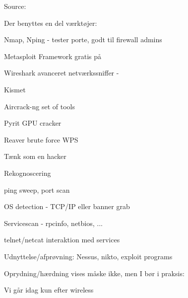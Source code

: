 \documentclass[20pt,landscape,a4paper,footrule]{foils}
\begin{document}


Source: 



\begin{list1}
\item Der benyttes en del værktøjer:
\begin{list2}
\item Nmap, Nping - tester porte, godt til firewall admins 
\item Metasploit Framework gratis på 
\item Wireshark avanceret netværkssniffer - 
\item Kismet 
\item Aircrack-ng set of tools 
\item Pyrit GPU cracker 
\item Reaver brute force WPS 
\end{list2}
\end{list1}



\begin{list1}
\item Tænk som en hacker
\item Rekognoscering
\begin{list2}
\item ping sweep, port scan
\item OS detection - TCP/IP eller banner grab
\item Servicescan - rpcinfo, netbios, ...
\item telnet/netcat interaktion med services
\end{list2}
\item Udnyttelse/afprøvning: Nessus, nikto, exploit programs
\item Oprydning/hærdning vises måske ikke, men I bør i praksis:
\end{list1}

\vskip 1cm
\centerline{\hlkbig Vi går idag kun efter wireless}
\end{document}
